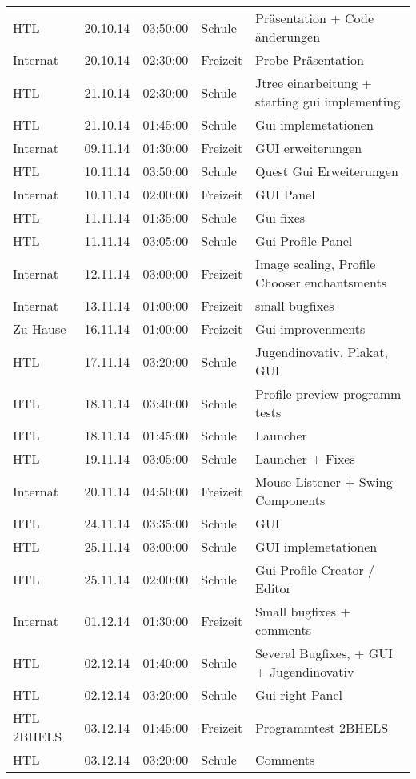 \begin{small}
\begin{longtable}{ p{} p{} p{} p{} p{}}
HTL	& 20.10.14	& 03:50:00	& Schule	& Pr\"asentation + Code \"anderungen \\
Internat	& 20.10.14	& 02:30:00	& Freizeit	& Probe Pr\"asentation \\
HTL	& 21.10.14	& 02:30:00	& Schule	& Jtree einarbeitung + starting gui implementing \\
HTL	& 21.10.14	& 01:45:00	& Schule	& Gui implemetationen \\
Internat	& 09.11.14	& 01:30:00	& Freizeit	& GUI erweiterungen \\
HTL	& 10.11.14	& 03:50:00	& Schule	& Quest Gui Erweiterungen \\
Internat	& 10.11.14	& 02:00:00	& Freizeit	& GUI Panel \\
HTL	& 11.11.14	& 01:35:00	& Schule	& Gui fixes \\
HTL	& 11.11.14	& 03:05:00	& Schule	& Gui Profile Panel \\
Internat	& 12.11.14	& 03:00:00	& Freizeit	& Image scaling, Profile Chooser enchantsments \\
Internat	& 13.11.14	& 01:00:00	& Freizeit	& small bugfixes \\
Zu Hause	& 16.11.14	& 01:00:00	& Freizeit	& Gui improvenments \\
HTL	& 17.11.14	& 03:20:00	& Schule	& Jugendinovativ, Plakat, GUI \\
HTL	& 18.11.14	& 03:40:00	& Schule	& Profile preview programm tests \\
HTL	& 18.11.14	& 01:45:00	& Schule	& Launcher \\
HTL	& 19.11.14	& 03:05:00	& Schule	& Launcher + Fixes \\
Internat	& 20.11.14	& 04:50:00	& Freizeit	& Mouse Listener + Swing Components \\
HTL	& 24.11.14	& 03:35:00	& Schule	& GUI  \\
HTL	& 25.11.14	& 03:00:00	& Schule	& GUI implemetationen \\
HTL	& 25.11.14	& 02:00:00	& Schule	& Gui Profile Creator / Editor \\
Internat	& 01.12.14	& 01:30:00	& Freizeit	& Small bugfixes + comments \\
HTL	& 02.12.14	& 01:40:00	& Schule	& Several Bugfixes, + GUI + Jugendinovativ \\
HTL	& 02.12.14	& 03:20:00	& Schule	& Gui right Panel \\
HTL 2BHELS	& 03.12.14	& 01:45:00	& Freizeit	& Programmtest 2BHELS \\
HTL	& 03.12.14	& 03:20:00	& Schule	& Comments \\

\end{longtable}
\end{small}
